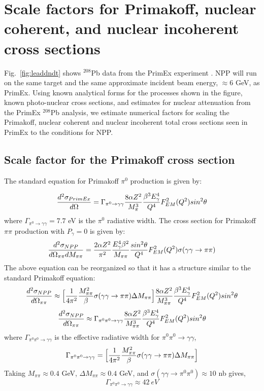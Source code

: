 \section{Scale factors for Primakoff, nuclear coherent, and nuclear incoherent cross sections  \label{sec:SigmaScaling}}
Fig.~\ref{fig:leaddndt} shows $^{208}$Pb data from the PrimEx experiment \cite{Larin:2010kq}.   NPP will run on the same target and the same approximate incident beam energy, $\approx 6$ GeV, as PrimEx.   Using known analytical forms for the processes shown in the figure, known photo-nuclear cross sections, and estimates for nuclear attenuation from the PrimEx $^{208}$Pb analysis, we estimate numerical factors for scaling the Primakoff, nuclear coherent and nuclear incoherent total cross sections seen in PrimEx to the conditions for NPP. 
    

 \subsection{Scale factor for the Primakoff cross section}
The standard equation for Primakoff $\pi^0$ production is given by: 

$$ { d^2 \sigma_{PrimEx} \over d \Omega } = \Gamma_{\pi^0 \rightarrow \gamma \gamma} { 8 \alpha Z^2 \over M^3_{\pi} }
{ \beta^3 E_\gamma^4 \over Q^4 } F^2_{EM}(Q^2) sin^2 \theta   $$ 
where $\Gamma_{\pi^0 \rightarrow \gamma \gamma} = 7.7$ eV is the $\pi^0$ radiative width.  The cross section for Primakoff $\pi \pi$ production with $P_{\gamma}=0$ is given by: 
$$ {d^2 \sigma_{NPP} \over d \Omega_{\pi \pi} dM_{\pi \pi} } = {2 \alpha Z^2 \over \pi^2} 
{E_\gamma^4 \beta^2 \over M_{\pi \pi} } {sin^2 \theta \over Q^4 } F^2_{EM}(Q^2) 
 \sigma( \gamma \gamma \rightarrow \pi \pi) $$
The above equation can be reorganized so that it has a structure similar to the standard Primakoff equation: 
$$ {d^2 \sigma_{NPP} \over d \Omega_{\pi \pi} } \approx
\Big[ {1 \over 4 \pi^2 }  {M^2_{\pi \pi} \over \beta }  \sigma( \gamma \gamma \rightarrow \pi \pi) \Delta M_{\pi \pi} \Big]  { 8 \alpha Z^2 \over M^3_{\pi \pi} }
{ \beta^3 E_\gamma^4 \over Q^4 } F^2_{EM}(Q^2) sin^2 \theta  $$
$$ {d^2 \sigma_{NPP} \over d \Omega_{\pi \pi} } \approx
\Gamma_{\pi^0 \pi^0 \rightarrow \gamma \gamma}  { 8 \alpha Z^2 \over M^3_{\pi \pi} }
{ \beta^3 E_\gamma^4 \over Q^4 } F^2_{EM}(Q^2) sin^2 \theta  $$
where  $\Gamma_{\pi^0 \pi^0 \rightarrow \gamma \gamma}$ is the effective radiative width for $\pi^0 \pi^0 \rightarrow \gamma \gamma$, 
$$ \Gamma_{\pi^0 \pi^0 \rightarrow \gamma \gamma} =\Big[ {1 \over 4 \pi^2 }  {M^2_{\pi \pi} \over \beta }  \sigma( \gamma \gamma \rightarrow \pi \pi) \Delta M_{\pi \pi} \Big] $$
Taking $M_{\pi \pi} \approx 0.4$ GeV, $\Delta M_{\pi \pi}\approx 0.4$ GeV, and $\sigma ( \gamma \gamma \rightarrow \pi^0 \pi^0) \approx 10$ nb gives, 
$$\Gamma_{\pi^0 \pi^0 \rightarrow \gamma \gamma} \approx 42\ eV$$

